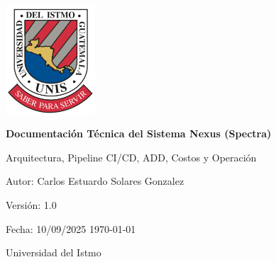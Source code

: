 \begin{titlepage}
\centering

\includegraphics[width=0.25\textwidth]{logo.png}\par\vspace{2cm}

{\Huge \textbf{Documentación Técnica del Sistema Nexus (Spectra)}\par}
\vspace{0.75cm}
{\Large Arquitectura, Pipeline CI/CD, ADD, Costos y Operación \par}
\vspace{1.25cm}

{\large Autor: Carlos Estuardo Solares Gonzalez \par}
{\large Versión: 1.0 \par}
{\large Fecha: 10/09/2025 \today\par}

\vfill

{\large Universidad del Istmo \par}

\end{titlepage}
\clearpage
